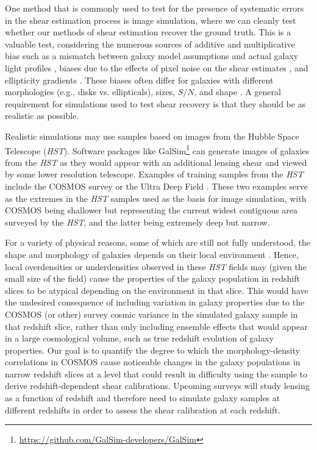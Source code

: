 \documentclass[twocolumn,useAMS,usenatbib]{mn2e}
\begin{document}
One method that is commonly used to test for the presence of
systematic errors in the shear estimation process is image simulation,
where we can cleanly test whether our methods of shear estimation
recover the ground truth. This is a valuable test, considering the
numerous sources of additive and multiplicative bias such as a
mismatch between galaxy model assumptions and actual galaxy light
profiles \citep[e.g.,][]{2010MNRAS.404..458V, 2010A&A...510A..75M}, biases due to the effects of pixel noise on the
shear estimates
\citep{2012MNRAS.427.2711K,2012MNRAS.424.2757M,2012MNRAS.425.1951R},
and ellipticity gradients \citep{2010MNRAS.406.2793B}.  These biases
often differ for galaxies with different morphologies (e.g., disks
vs. ellipticals), sizes, $S/N$, and shape \citep{2010MNRAS.405.2044B,2012MNRAS.423.3163K}. 
A general requirement for simulations used to test shear recovery is
that they should be as realistic as possible.
 
 Realistic simulations may use samples based on images from the Hubble
 Space Telescope ({\em HST}).
Software packages like
{\sc GalSim}\footnote{\url{https://github.com/GalSim-developers/GalSim}}
\citep{2014arXiv1407.7676R} can generate images of galaxies from the
{\em HST} as they would appear with an additional lensing shear and
viewed by some lower resolution telescope.  Examples of training samples from the {\em HST} include 
the COSMOS survey \citep[used by the GREAT3 challenge,][]{great3} or the
 Ultra Deep Field \citep[UDF, used by][]{2013ApJ...765...74J}.  These
 two examples serve as the extremes in the {\em HST} samples used as
 the basis for image simulation, with COSMOS being shallower but
representing the current widest contiguous area surveyed by the {\em HST}, and the
 latter being extremely deep but narrow.

For a variety of physical reasons, some of which are still not fully
understood, the shape and morphology of
galaxies depends on their local environment
\citep[e.g.,][]{2014arXiv1402.1172C,2014MNRAS.444.2200D}. 
Hence, local overdensities or underdensities
observed in these {\em HST} fields may (given the small size of the field)
cause the properties of the galaxy population in redshift slices to be
atypical depending on the environment in that slice.  This would have
the undesired consequence of including variation in galaxy properties
due to the COSMOS (or other) survey cosmic variance in the simulated galaxy sample in that redshift slice, rather than
only including ensemble effects that would appear in a large cosmological volume, such as true redshift evolution of
galaxy properties.  Our goal is to quantify the degree to which the
morphology-density correlations in COSMOS cause noticeable changes in
the galaxy populations in narrow redshift slices at a level that could
result in difficulty using the sample to derive redshift-dependent
shear calibrations.   Upcoming surveys will study lensing as a function of
redshift and therefore need to simulate galaxy samples at different
redshifts in order to assess the shear calibration at each redshift.
\end{document}
